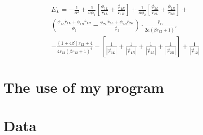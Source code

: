 \documentclass{article}
\begin{document}
 \begin{multline}
 E_L = -\frac{1}{a^2} + \frac{1}{a\phi_1}\left[ \frac{\phi_{1L}}{r_{1L}}+\frac{\phi_{1R}}{r_{1R}} \right] + \frac{1}{a\phi_2} \left[ \frac{\phi_{2L}}{r_{2L}}+\frac{\phi_{2R}}{r_{2R}}\right]
 + \\ \left(  \frac{\phi_{1L}\hat{r}_{1L}+\phi_{1R}\hat{r}_{1R}}{\phi_1}   -    \frac{\phi_{2L}\hat{r}_{2L}+\phi_{2R}\hat{r}_{2R}}{\phi_2}     \right) \cdot \frac{\hat{r}_{12}}{2 a(\beta r_{12}+1)^2} \\
  -   \frac{(1+4 \beta) r_{12} + 4}{4r_{12}(\beta r_{12}+1)^4} 
  - \left[ \frac{1}{|\vec{r}_{1L}|} +\frac{1}{|\vec{r}_{1R}|}+\frac{1}{|\vec{r}_{2L}|}+\frac{1}{|\vec{r}_{2R}|} \right] +\frac{1}{\left| \vec{r}_{12} \right|} 
\end{multline}



\section{The use of my program}


\section{Data}
\end{document}
